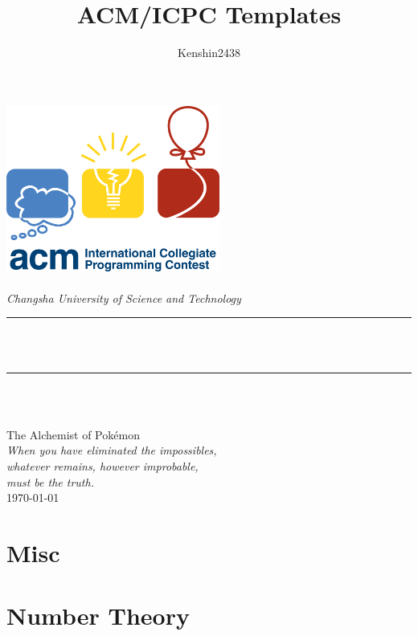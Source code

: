 \documentclass[a4paper,12pt,twoside,fontset=fandol,UTF8]{ctexbook}
\begin{document}
\title{ACM/ICPC Templates}
\author{\textup{Kenshin2438}}

\begin{titlepage}
  \newcommand{\HRule}{\rule{\linewidth}{0.5mm}}
  \centering
  \includegraphics[width=7cm]{icpc.png}\\[1cm]
  \quad\\[1.5cm]
  \textsl{\Large Changsha University of Science and Technology }\\[0.5cm]
  \makeatletter
  \HRule \\[0.4cm]
  { \huge \bfseries \@title }\\[0.4cm]
  \HRule \\[1.5cm]
  \begin{minipage}{0.4\textwidth}
    \centering\large\@author
  \end{minipage}\\[3cm]
  \makeatother
  {\large The Alchemist of Pokémon}\\[2cm]
  {\large 
    \emph{
      When you have eliminated the impossibles, \\
      whatever remains, however improbable, \\
      must be the truth.}
  }\\[0.5cm]
  {\large \today}\\[2cm]
  \vfill
\end{titlepage}
\newpage %
\tableofcontents

\chapter{Misc}
\setcounter{page}{1} %

\chapter{Number Theory}

\end{document}
